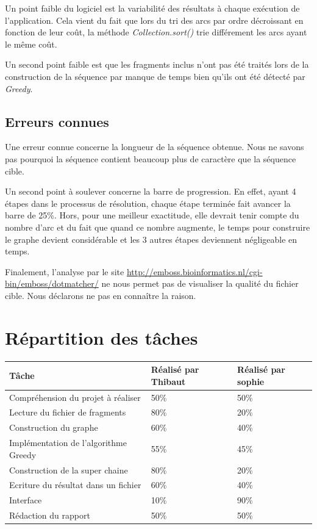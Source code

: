 \documentclass[12pt,a4paper,final]{article}
\begin{document}
Un point faible du logiciel est la variabilité des résultats à chaque exécution de l'application.  Cela vient du fait que lors du tri des arcs par ordre décroissant en fonction de leur coût, la méthode \textit{Collection.sort()} trie différement les arcs ayant le même coût.\medskip


Un second point faible est que les fragments inclus n'ont pas été traités lors de la construction de la séquence par manque de temps bien qu'ils ont été détecté par \textit{Greedy}.

\subsection{Erreurs connues}

Une erreur connue concerne la longueur de la séquence obtenue.  Nous ne savons pas pourquoi la séquence contient beaucoup plus de caractère que la séquence cible.

Un second point à soulever concerne la barre de progression. En effet, ayant 4 étapes dans le processus de résolution, chaque étape terminée fait avancer la barre de 25\%. Hors, pour une meilleur exactitude, elle devrait tenir compte du nombre d'arc et du fait que quand ce nombre augmente, le temps pour construire le graphe devient considérable et les 3 autres étapes deviennent négligeable en temps.

Finalement, l'analyse par le site \url{http://emboss.bioinformatics.nl/cgi-bin/emboss/dotmatcher/} ne nous permet pas de visualiser la qualité du fichier cible. Nous déclarons ne pas en connaître la raison.

\newpage
\section{Répartition des tâches}

\begin{table}[!ht]
\centering
\begin{tabular}{|l|l|l|}
	\hline
	Tâche & Réalisé par Thibaut & Réalisé par sophie\\
	\hline
	Compréhension du projet à réaliser & 50\% & 50\% \\
	Lecture du fichier de fragments & 80\% & 20\% \\
	Construction du graphe & 60\% & 40\% \\
	Implémentation de l'algorithme Greedy & 55\% & 45\% \\
	Construction de la super chaine & 80\% & 20\% \\
	Ecriture du résultat dans un fichier & 60\% & 40\% \\
	Interface & 10\% & 90\% \\
	Rédaction du rapport  & 50\% & 50\% \\ %
\end{tabular}
\end{table}
\end{document}
